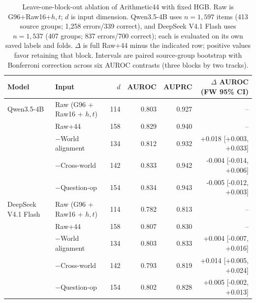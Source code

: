 \begin{table}[t]
\centering
\small
\begin{tabular}{llrrrr}
\toprule
Model & Input & $d$ & AUROC & AUPRC & \shortstack{$\Delta$ AUROC\\(FW 95\% CI)} \\
\midrule
Qwen3.5-4B & Raw (G96 + Raw16 + $h,t$) & 114 & 0.803 & 0.927 & -- \\
 & Raw+44 & 158 & 0.829 & 0.940 & -- \\
 & $-$World alignment & 134 & 0.812 & 0.932 & +0.018 [+0.003, +0.033] \\
 & $-$Cross-world & 142 & 0.833 & 0.942 & -0.004 [-0.014, +0.006] \\
 & $-$Question-op & 154 & 0.834 & 0.943 & -0.005 [-0.012, +0.003] \\
\addlinespace
DeepSeek V4.1 Flash & Raw (G96 + Raw16 + $h,t$) & 114 & 0.782 & 0.813 & -- \\
 & Raw+44 & 158 & 0.807 & 0.830 & -- \\
 & $-$World alignment & 134 & 0.803 & 0.833 & +0.004 [-0.007, +0.016] \\
 & $-$Cross-world & 142 & 0.793 & 0.819 & +0.014 [+0.005, +0.024] \\
 & $-$Question-op & 154 & 0.802 & 0.828 & +0.005 [-0.002, +0.013] \\
\bottomrule
\end{tabular}
\caption{Leave-one-block-out ablation of Arithmetic44 with fixed HGB. Raw is G96+Raw16+$h,t$; $d$ is input dimension. Qwen3.5-4B uses $n=1,597$ items (413 source groups; 1,258 errors/339 correct), and DeepSeek V4.1 Flash uses $n=1,537$ (407 groups; 837 errors/700 correct); each is evaluated on its own saved labels and folds. $\Delta$ is full Raw+44 minus the indicated row; positive values favor retaining that block. Intervals are paired source-group bootstrap with Bonferroni correction across six AUROC contrasts (three blocks by two tracks).}
\label{tab:raw44-component-ablation}
\end{table}

